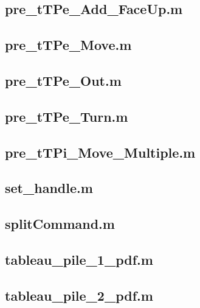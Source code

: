 \documentclass[runningheads,a4paper]{llncs}
\newcommand{\GPenSIM}{../GPenSIM}
\begin{document}
\subsection{pre\_tTPe\_Add\_FaceUp.m}
\label{app:pre_tTPe_Add_FaceUp}


\subsection{pre\_tTPe\_Move.m}
\label{app:pre_tTPe_Move}


\subsection{pre\_tTPe\_Out.m}
\label{app:pre_tTPe_Out}


\subsection{pre\_tTPe\_Turn.m}
\label{app:pre_tTPe_Turn}


\subsection{pre\_tTPi\_Move\_Multiple.m}
\label{app:pre_tTPi_Move_Multiple}


\subsection{set\_handle.m}
\label{app:set_handle}


\subsection{splitCommand.m}
\label{app:splitCommand}


\subsection{tableau\_pile\_1\_pdf.m}
\label{app:tableau_pile_1_pdf}


\subsection{tableau\_pile\_2\_pdf.m}
\label{app:tableau_pile_2_pdf}

\end{document}
